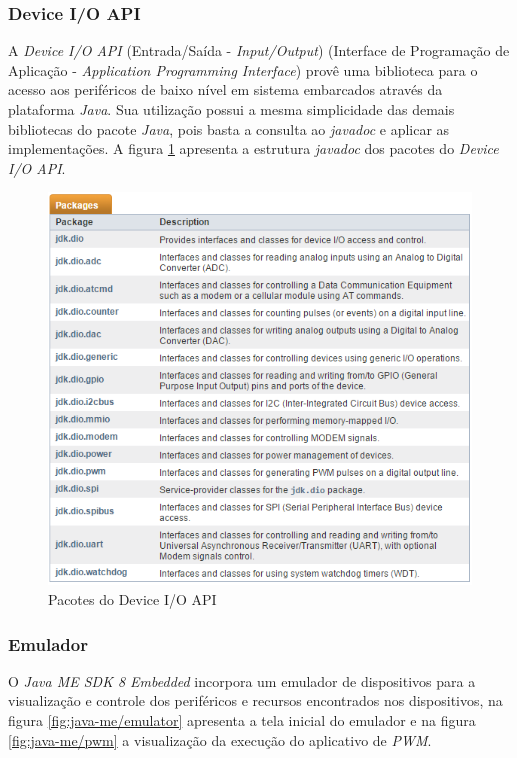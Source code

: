 \subsubsection{Device I/O API}

A \textit{Device I/O API} (Entrada/Saída - \textit{Input/Output}) (Interface de
Programação de Aplicação - \textit{Application Programming Interface}) provê
uma biblioteca para o acesso aos periféricos de baixo nível em sistema
embarcados através da plataforma \textit{Java}. Sua utilização possui a mesma
simplicidade das demais bibliotecas do pacote \textit{Java}, pois basta a
consulta ao \textit{javadoc} e aplicar as implementações. A figura
\ref{fig:java-me/java-me-javadoc-deviceioapi} apresenta a estrutura
\textit{javadoc} dos pacotes do \textit{Device I/O API}.

\begin{figure}[H]
    \centering
    \includegraphics[width=0.7\linewidth]{figuras/java/java-me-javadoc-deviceioapi.png}
    \caption{Pacotes do Device I/O API}
    \label{fig:java-me/java-me-javadoc-deviceioapi}
\end{figure}

\subsubsection{Emulador}

O \textit{Java ME SDK 8 Embedded} incorpora um emulador de dispositivos para a
visualização e controle dos periféricos e recursos encontrados nos
dispositivos, na figura \ref{fig:java-me/emulator} apresenta a tela inicial do
emulador e na figura \ref{fig:java-me/pwm} a visualização da execução do
aplicativo de \textit{PWM}.

